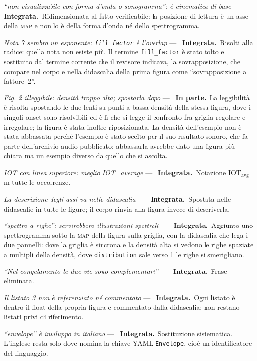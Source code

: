\documentclass[11pt,a4paper]{article}
\newcommand{\integrata}{\textbf{Integrata.}}
\newcommand{\parziale}{\textbf{In parte.}}
\newenvironment{rilievi}
  {\begin{list}{}{%
    \setlength{\leftmargin}{1.6em}\setlength{\itemindent}{-1.6em}%
    \setlength{\itemsep}{4pt}\setlength{\parsep}{0pt}\setlength{\topsep}{4pt}}}
  {\end{list}}
\newcommand{\voce}[1]{\item \textit{#1} ---\ }
\begin{document}
\begin{rilievi}
\voce{``non visualizzabile con forma d'onda o sonogramma'': è cinematica di
base} \integrata\ Ridimensionata al fatto verificabile: la posizione di
lettura è un asse della \textsc{map} e non lo è della forma d'onda né dello
spettrogramma.

\voce{Nota 7 sembra un esponente; \texttt{fill\_factor} è l'overlap}
\integrata\ Risolti alla radice: quella nota non esiste più. Il termine
\texttt{fill\_factor} è stato tolto e sostituito dal termine corrente che il
revisore indicava, la sovrapposizione, che compare nel corpo e nella
didascalia della prima figura come ``sovrapposizione a fattore~2''.

\voce{Fig. 2 illeggibile: densità troppo alta; spostarla dopo} \parziale\
La leggibilità è risolta spostando le due lenti su punti a bassa densità
della stessa figura, dove i singoli onset sono risolvibili ed è lì che si
legge il confronto fra griglia regolare e irregolare; la figura è stata
inoltre riposizionata. La densità dell'esempio non è stata abbassata perché
l'esempio è stato scelto per il suo risultato sonoro, che fa parte
dell'archivio audio pubblicato: abbassarla avrebbe dato una figura più
chiara ma un esempio diverso da quello che si ascolta.

\voce{IOT con linea superiore: meglio IOT\_average} \integrata\ Notazione
$\mathrm{IOT}_{\mathrm{avg}}$ in tutte le occorrenze.

\voce{La descrizione degli assi va nella didascalia} \integrata\ Spostata
nelle didascalie in tutte le figure; il corpo rinvia alla figura invece di
descriverla.

\voce{``spettro a righe'': servirebbero illustrazioni spettrali} \integrata\
Aggiunto uno spettrogramma sotto la \textsc{map} della figura sulla griglia,
con la didascalia che lega i due pannelli: dove la griglia è sincrona e la
densità alta si vedono le righe spaziate a multipli della densità, dove
\texttt{distribution} sale verso 1 le righe si smerigliano.

\voce{``Nel congelamento le due vie sono complementari''} \integrata\ Frase
eliminata.

\voce{Il listato 3 non è referenziato né commentato} \integrata\ Ogni
listato è dentro il float della propria figura e commentato dalla
didascalia; non restano listati privi di riferimento.

\voce{``envelope'' è \emph{inviluppo} in italiano} \integrata\ Sostituzione
sistematica. L'inglese resta solo dove nomina la chiave YAML
\texttt{Envelope}, cioè un identificatore del linguaggio.


\end{rilievi}
\end{document}
